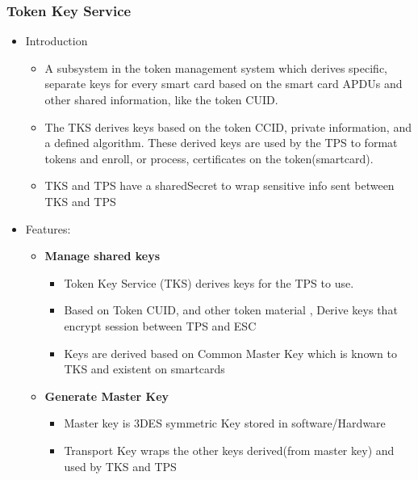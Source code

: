 \documentclass[12pt]{report}
\begin{document}
\subsubsection{Token Key Service}
    \begin{itemize}
        \item Introduction
            \begin{itemize}
                \item A subsystem in the token management system which derives specific, separate keys for every
                    smart card based on the smart card APDUs and other shared information, like the token CUID.~\cite{RedHat:AdminGuide}
                \item The TKS derives keys based on the token CCID, private information, and a defined algorithm. 
                    These derived keys are used by the TPS to format tokens and enroll, or process, certificates on the token(smartcard).~\cite{RedHat:AdminGuide}
                \item TKS and TPS have a sharedSecret to wrap sensitive info sent between TKS and TPS
            \end{itemize}
        \item Features:
            \begin{itemize}
                \item \textbf{Manage shared keys}
                    \begin{itemize}
                        \item Token Key Service (TKS) derives keys for the TPS to use.
                        \item Based on Token CUID, and other token material , Derive keys that encrypt session between TPS and ESC
                        \item Keys are derived based on Common Master Key which is known to TKS and existent on smartcards
                    \end{itemize}
                \item \textbf{Generate Master Key}
                    \begin{itemize}
                        \item Master key is 3DES symmetric Key stored in software/Hardware
                        \item Transport Key wraps the other keys derived(from master key) and used by TKS and TPS
                    \end{itemize}
            \end{itemize}
    \end{itemize}
\end{document}
